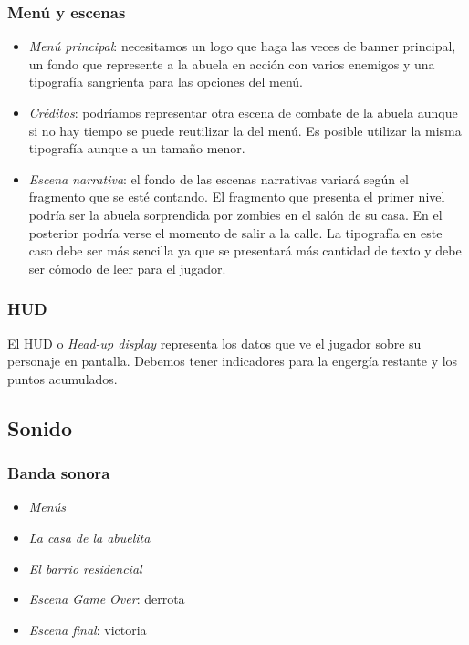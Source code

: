 \documentclass[titlepage]{article}
\begin{document}
\subsubsection{Menú y escenas}
\begin{itemize}
	\item \emph{Menú principal}: necesitamos un logo que haga las veces de banner principal, un fondo que represente a la abuela en acción con varios enemigos y una tipografía sangrienta para las opciones del menú.
	\item \emph{Créditos}: podríamos representar otra escena de combate de la abuela aunque si no hay tiempo se puede reutilizar la del menú. Es posible utilizar la misma tipografía aunque a un tamaño menor.
	\item \emph{Escena narrativa}: el fondo de las escenas narrativas variará según el fragmento que se esté contando. El fragmento que presenta el primer nivel podría ser la abuela sorprendida por zombies en el salón de su casa. En el posterior podría verse el momento de salir a la calle. La tipografía en este caso debe ser más sencilla ya que se presentará más cantidad de texto y debe ser cómodo de leer para el jugador.
\end{itemize}

\subsubsection{HUD}
El HUD o \emph{Head-up display} representa los datos que ve el jugador sobre su personaje en pantalla. Debemos tener indicadores para la engergía restante y los puntos acumulados.

\subsection{Sonido}

\subsubsection{Banda sonora}
\begin{itemize}
	\item \emph{Menús}
	\item \emph{La casa de la abuelita}
	\item \emph{El barrio residencial}
	\item \emph{Escena Game Over}: derrota
	\item \emph{Escena final}: victoria
\end{itemize}
\end{document}
